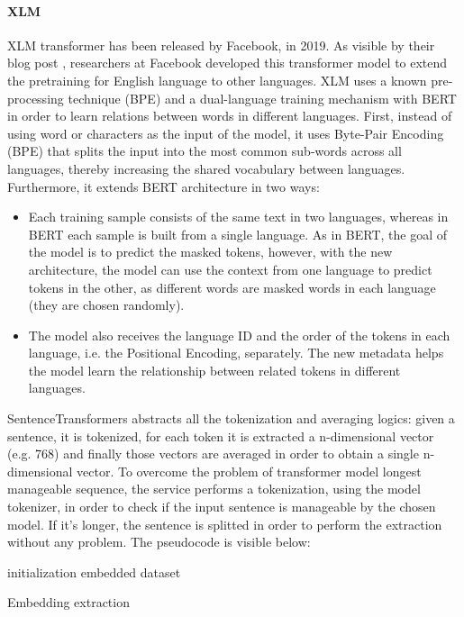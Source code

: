 \documentclass[\main/main.tex]{subfiles}
\begin{document}
\paragraph{XLM}
XLM transformer has been released by Facebook, in 2019. As visible by their blog post \cite{xlm_blog_post}, researchers at Facebook developed this transformer model to extend the pretraining for English language to other languages. XLM uses a known pre-processing technique (BPE) and a dual-language training mechanism with BERT in order to learn relations between words in different languages. First, instead of using word or characters as the input of the model, it uses Byte-Pair Encoding (BPE) that splits the input into the most common sub-words across all languages, thereby increasing the shared vocabulary between languages. Furthermore, it extends BERT architecture in two ways:
\begin{itemize}
    \item Each training sample consists of the same text in two languages, whereas in BERT each sample is built from a single language. As in BERT, the goal of the model is to predict the masked tokens, however, with the new architecture, the model can use the context from one language to predict tokens in the other, as different words are masked words in each language (they are chosen randomly).
    \item The model also receives the language ID and the order of the tokens in each language, i.e. the Positional Encoding, separately. The new metadata helps the model learn the relationship between related tokens in different languages.
\end{itemize}
\cite{DBLP:journals/corr/abs-1901-07291}

SentenceTransformers abstracts all the tokenization and averaging logics: given a sentence, it is tokenized, for each token it is extracted a n-dimensional vector (e.g. 768) and finally those vectors are averaged in order to obtain a single n-dimensional vector. To overcome the problem of transformer model longest manageable sequence, the service performs a tokenization, using the model tokenizer, in order to check if the input sentence is manageable by the chosen model. If it's longer, the sentence is splitted in order to perform the extraction without any problem. The pseudocode is visible below:
\begin{center}
    \begin{algorithm}[H]
     initialization
     \Return embedded dataset
     \caption{Embedding extraction}
    \end{algorithm}
\end{center}
\end{document}
